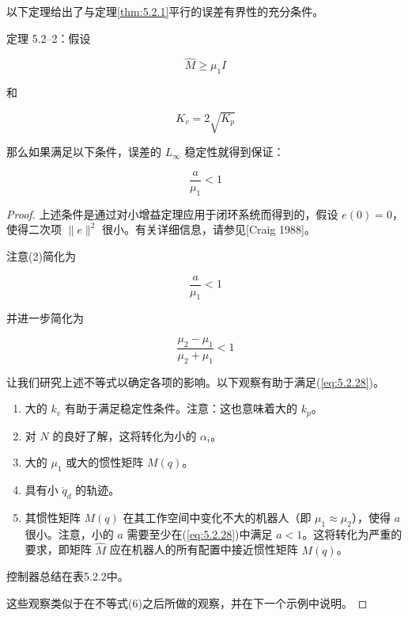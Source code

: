 \documentclass[UTF8,12pt,a4paper]{ctexart}
\begin{document}
以下定理给出了与定理\ref{thm:5.2.1}平行的误差有界性的充分条件。

\begin{theorem}\label{thm:5.2.2}
定理 5.2--2：假设

\begin{equation}
\hat{M} \geq \mu_1 I
\end{equation}

和

\begin{equation}
K_v = 2\sqrt{K_p}
\end{equation}

那么如果满足以下条件，误差的 $L_\infty$ 稳定性就得到保证：

\begin{equation}
\frac{a}{\mu_1} < 1
\end{equation}
\end{theorem}

\begin{proof}
上述条件是通过对小增益定理应用于闭环系统而得到的，假设 $e(0) = 0$，使得二次项 $\|e\|^2$ 很小。有关详细信息，请参见[Craig 1988]。

注意(2)简化为

\begin{equation}
\frac{a}{\mu_1} < 1
\end{equation}

并进一步简化为

\begin{equation}\label{eq:5.2.28}
\frac{\mu_2 - \mu_1}{\mu_2 + \mu_1} < 1
\end{equation}

让我们研究上述不等式以确定各项的影响。以下观察有助于满足(\ref{eq:5.2.28})。
\begin{enumerate}
    \item 大的 $k_v$ 有助于满足稳定性条件。注意：这也意味着大的 $k_p$。
    \item 对 $N$ 的良好了解，这将转化为小的 $\alpha_i$。
    \item 大的 $\mu_1$ 或大的惯性矩阵 $M(q)$。
    \item 具有小 $\ddot{q}_d$ 的轨迹。
    \item 其惯性矩阵 $M(q)$ 在其工作空间中变化不大的机器人（即 $\mu_1 \approx \mu_2$），使得 $a$ 很小。注意，小的 $a$ 需要至少在(\ref{eq:5.2.28})中满足 $a < 1$。这将转化为严重的要求，即矩阵 $\hat{M}$ 应在机器人的所有配置中接近惯性矩阵 $M(q)$。
\end{enumerate}

控制器总结在表5.2.2中。

这些观察类似于在不等式(6)之后所做的观察，并在下一个示例中说明。
\end{proof}
\end{document}
